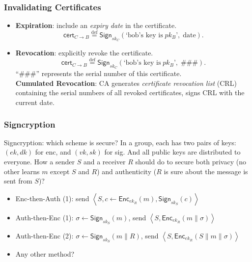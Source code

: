 \begin{frame}\frametitle{Invalidating Certificates}
\begin{itemize}
\item \textbf{Expiration}: include an \emph{expiry date} in the certificate.
\[\mathsf{cert}_{C \to B} \overset{\text{def}}{=} \mathsf{Sign}_{sk_C}(\text{`bob's key is}\; pk_B \text{'},\; \text{date}). \]
\item \textbf{Revocation}: explicitly revoke the certificate.
\[\mathsf{cert}_{C \to B} \overset{\text{def}}{=} \mathsf{Sign}_{sk_C}(\text{`bob's key is}\; pk_B \text{'},\; \text{\#\#\#}).  \]
``\#\#\#'' represents the serial number of this certificate.\\
\textbf{Cumulated Revocation}: CA generates \emph{certificate revocation list} (CRL) containing the serial numbers of all revoked certificates, signs CRL with the current date. 
\end{itemize}
\end{frame}
\begin{frame}\frametitle{Signcryption}
\begin{exampleblock}{Signcryption: which scheme is secure?}
In a group, each has two pairs of keys: $(ek, dk)$ for enc, and $(vk, sk)$ for sig. And all public keys are distributed to everyone. How a sender $S$ and a receiver $R$ should do to secure both privacy (no other learns $m$ except $S$ and $R$) and authenticity ($R$ is sure about the message is sent from $S$)?
\begin{itemize}
\item Enc-then-Auth (1): send $\left< S, c \leftarrow \mathsf{Enc}_{ek_R}(m), \mathsf{Sign}_{sk_S}(c) \right>$
\item Auth-then-Enc (1): $\sigma \leftarrow \mathsf{Sign}_{sk_S}(m)$, send $\left< S, \mathsf{Enc}_{ek_R}(m\| \sigma) \right>$
\item Auth-then-Enc (2): $\sigma \leftarrow \mathsf{Sign}_{sk_S}(m \| R)$, send $\left< S, \mathsf{Enc}_{ek_R}(S\| m \| \sigma) \right>$
\item Any other method?
\end{itemize}
\end{exampleblock}
\end{frame}
